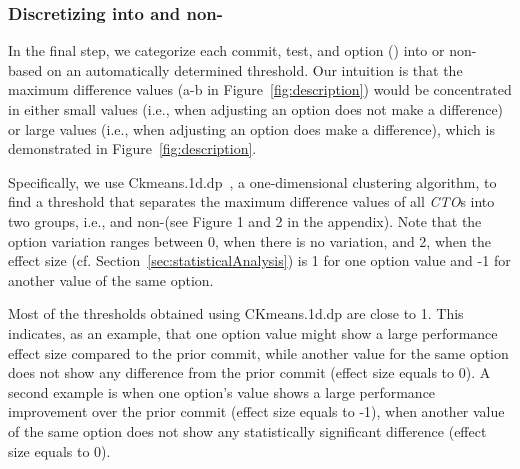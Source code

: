 

\subsubsection{Discretizing \instance into \inconsistent and non-\inconsistent}
\label{sec:discretizing}
In the final step, we categorize each commit, test, and option (\instance) into \inconsistent or non-\inconsistent %
based on an automatically determined threshold. Our intuition is that the maximum difference values (a-b in Figure~\ref{fig:description}) would be concentrated in either small values %
(i.e., when adjusting an option does not make a difference) or large values (i.e., when adjusting an option does make a difference), which is demonstrated in Figure~\ref{fig:description}. %

Specifically, we use Ckmeans.1d.dp~\cite{Ckmeans138:online}, a one-dimensional clustering algorithm, to find a threshold that separates the maximum difference values of all \emph{CTO}s %
into two groups, i.e., \inconsistent and non-\inconsistent (see Figure 1 and 2 in the appendix). 
Note that the option variation ranges between 0, when there is no variation, and 2, when the effect size (cf. Section~\ref{sec:statisticalAnalysis}) is 1 for one option value and -1 for another value of the same option.

Most of the thresholds obtained using CKmeans.1d.dp are close to 1. This indicates, as an example, that one option value might show a large performance effect size compared to the prior commit, while another value for the same option does not show any difference from the prior commit (effect size equals to 0). A second example is when one option's value shows a large performance improvement over the prior commit (effect size equals to -1), when another value of the same option does not show any statistically significant difference (effect size equals to 0).



